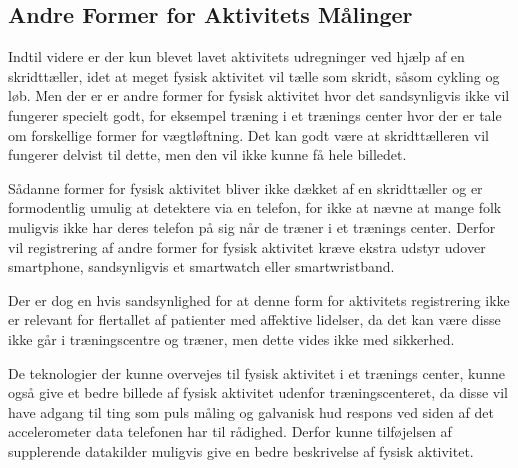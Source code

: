 \subsection{Andre Former for Aktivitets Målinger}
Indtil videre er der kun blevet lavet aktivitets udregninger ved hjælp af en skridttæller, idet at meget fysisk aktivitet vil tælle som skridt, såsom cykling og løb. 
Men der er er andre former for fysisk aktivitet hvor det sandsynligvis ikke vil fungerer specielt godt, for eksempel træning i et trænings center hvor der er tale om forskellige former for vægtløftning. 
Det kan godt være at skridttælleren vil fungerer delvist til dette, men den vil ikke kunne få hele billedet.

Sådanne former for fysisk aktivitet bliver ikke dækket af en skridttæller og er formodentlig umulig at detektere via en telefon, for ikke at nævne at mange folk muligvis ikke har deres telefon på sig når de træner i et trænings center.
Derfor vil registrering af andre former for fysisk aktivitet kræve ekstra udstyr udover smartphone, sandsynligvis et smartwatch eller smartwristband.

Der er dog en hvis sandsynlighed for at denne form for aktivitets registrering ikke er relevant for flertallet af patienter med affektive lidelser, da det kan være disse ikke går i træningscentre og træner, men dette vides ikke med sikkerhed.

De teknologier der kunne overvejes til fysisk aktivitet i et trænings center, kunne også give et bedre billede af fysisk aktivitet udenfor træningscenteret, da disse vil have adgang til ting som puls måling og galvanisk hud respons ved siden af det accelerometer data telefonen har til rådighed.
Derfor kunne tilføjelsen af supplerende datakilder muligvis give en bedre beskrivelse af fysisk aktivitet.